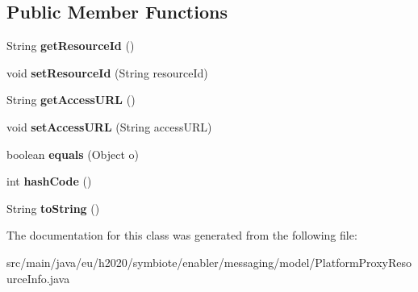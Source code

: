 \subsection*{Public Member Functions}
\begin{DoxyCompactItemize}
\item 
\mbox{\label{classeu_1_1h2020_1_1symbiote_1_1enabler_1_1messaging_1_1model_1_1PlatformProxyResourceInfo_a3ca3ae0ea1a0ae24e4dea4adc92c2a76}} 
String {\bfseries get\+Resource\+Id} ()
\item 
\mbox{\label{classeu_1_1h2020_1_1symbiote_1_1enabler_1_1messaging_1_1model_1_1PlatformProxyResourceInfo_a1683165aad540047f20fac1bddb52e7d}} 
void {\bfseries set\+Resource\+Id} (String resource\+Id)
\item 
\mbox{\label{classeu_1_1h2020_1_1symbiote_1_1enabler_1_1messaging_1_1model_1_1PlatformProxyResourceInfo_aeb9731f04d391b7f3540986d126dc041}} 
String {\bfseries get\+Access\+U\+RL} ()
\item 
\mbox{\label{classeu_1_1h2020_1_1symbiote_1_1enabler_1_1messaging_1_1model_1_1PlatformProxyResourceInfo_affd6a8a7c9a3adbf6c9efe3c1743266d}} 
void {\bfseries set\+Access\+U\+RL} (String access\+U\+RL)
\item 
\mbox{\label{classeu_1_1h2020_1_1symbiote_1_1enabler_1_1messaging_1_1model_1_1PlatformProxyResourceInfo_ab7a809622d078a78434e9fd2764a26dc}} 
boolean {\bfseries equals} (Object o)
\item 
\mbox{\label{classeu_1_1h2020_1_1symbiote_1_1enabler_1_1messaging_1_1model_1_1PlatformProxyResourceInfo_a7cd0973218dcf67bc48c64e7c86490c8}} 
int {\bfseries hash\+Code} ()
\item 
\mbox{\label{classeu_1_1h2020_1_1symbiote_1_1enabler_1_1messaging_1_1model_1_1PlatformProxyResourceInfo_ab0b264d8555fc40e238d69f7a62f5d22}} 
String {\bfseries to\+String} ()
\end{DoxyCompactItemize}


The documentation for this class was generated from the following file\+:\begin{DoxyCompactItemize}
\item 
src/main/java/eu/h2020/symbiote/enabler/messaging/model/Platform\+Proxy\+Resource\+Info.\+java\end{DoxyCompactItemize}
